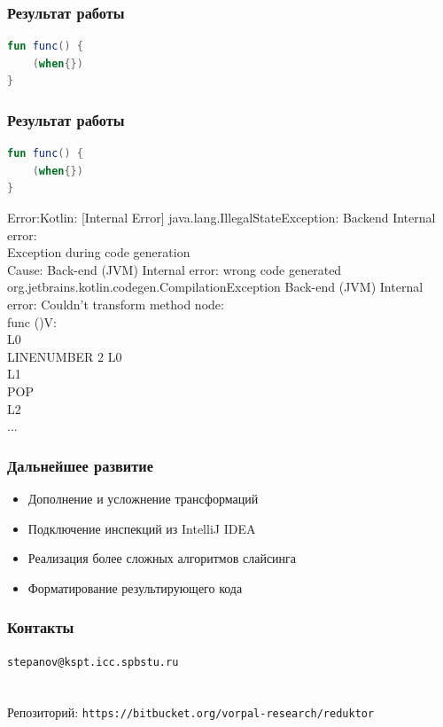 \begin{frame}[fragile]
	\frametitle{Результат работы}
	\begin{lstlisting}[basicstyle=\footnotesize, language = Kotlin]
fun func() {
    (when{})
}
\end{lstlisting}
	
\end{frame}


\begin{frame}[fragile]
	\frametitle{Результат работы}
	\begin{lstlisting}[basicstyle=\footnotesize, language = Kotlin]
fun func() {
    (when{})
}
\end{lstlisting}

{\color{red}
\tiny{
Error:Kotlin: [Internal Error] java.lang.IllegalStateException: Backend Internal error:\\ Exception during code generation\\
Cause: Back-end (JVM) Internal error: wrong code generated\\
org.jetbrains.kotlin.codegen.CompilationException Back-end (JVM) Internal error: Couldn't transform method node:\\
func ()V:\\
   L0\\
    LINENUMBER 2 L0\\
       L1\\
    POP\\
   L2\\
   ...
}
}
	
\end{frame}



\begin{frame}
	\frametitle{Дальнейшее развитие}
	\begin{itemize}
		\item Дополнение и усложнение трансформаций
		\item Подключение инспекций из IntelliJ IDEA
		\item Реализация более сложных алгоритмов слайсинга
		\item Форматирование результирующего кода
	\end{itemize}
\end{frame}



\begin{frame}[fragile]
\frametitle{Контакты}
\texttt{stepanov@kspt.icc.spbstu.ru} \\ \ \\ \ \\
Репозиторий: \texttt{https://bitbucket.org/vorpal-research/reduktor}
\end{frame}
